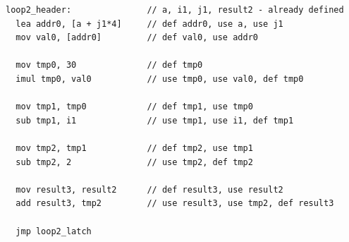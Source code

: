 \begin{lstlisting}
loop2_header:               // a, i1, j1, result2 - already defined
  lea addr0, [a + j1*4]     // def addr0, use a, use j1
  mov val0, [addr0]         // def val0, use addr0
  
  mov tmp0, 30              // def tmp0
  imul tmp0, val0           // use tmp0, use val0, def tmp0
  
  mov tmp1, tmp0            // def tmp1, use tmp0
  sub tmp1, i1              // use tmp1, use i1, def tmp1
  
  mov tmp2, tmp1            // def tmp2, use tmp1
  sub tmp2, 2               // use tmp2, def tmp2
  
  mov result3, result2      // def result3, use result2
  add result3, tmp2         // use result3, use tmp2, def result3
  
  jmp loop2_latch
\end{lstlisting}

\newpage


